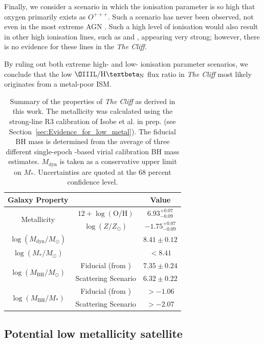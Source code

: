 \documentclass[fleqn,usenatbib]{mnras}
\newcommand{\Hbeta}{\text{H\textbeta}\xspace}
\newcommand{\HeIIL}{\permittedEL[He][ii]}
\newcommand{\CIV}{\permittedEL[C][iv]}
\newcommand{\cliff}{\textit{The Cliff}\xspace}
\begin{document}
Finally, we consider a scenario in which the ionisation parameter is so high that oxygen primarily exists as $O^{+++}$. Such a scenario has never been observed, not even in the most extreme AGN \citep{Dors2020}. 
Such a high level of ionisation would also result in other high ionisation lines, such as \CIV and \HeIIL \citep{Wang2025_HeII}, appearing very strong; however, there is no evidence for these lines in the \cliff \citep{deGraaff2025}.

By ruling out both extreme high- and low- ionisation parameter scenarios, we conclude that the low $\OIIIL/\Hbeta_\mathrm{N}$ flux ratio in \cliff most likely originates from a metal-poor ISM. 


{\renewcommand{\arraystretch}{1.4}
\begin{table}
\normalsize
\centering
 \begin{tabular}{c || c c} 
 \hline
 \hline
 Galaxy Property & & Value \\ 
 \hline
 \multirow{2}{*}{Metallicity} & $12 + \log(\mathrm{O/H})$  & $6.93^{+0.07}_{-0.09}$ \\
  & $\log(Z/Z_\odot)$ & $-1.75^{+0.07}_{-0.09}$ \\
  \hline
 $\log(M_\mathrm{dyn}/M_\odot)$ & & $8.41\pm0.12$  \\
 $\log(M_\mathrm{*}/M_\odot)$ & & $<8.41$ \\
 \hline
 \multirow{2}{*}{$\log(M_\mathrm{BH}/M_\odot)$} & Fiducial (from \Hbeta) & $7.35\pm0.24$\\
  & Scattering Scenario & $6.32\pm0.22$ \\
  \hline
 \multirow{2}{*}{$\log(M_\mathrm{BH}/M_\ast)$} & Fiducial (from \Hbeta) & $>-1.06$\\
 & Scattering Scenario & $>-2.07$\\
 \hline
 \hline
 \end{tabular}
 \caption{Summary of the properties of \cliff as derived in this work. 
 The metallicity was calculated using the strong-line R3 calibration of Isobe et al. in prep. (see Section~\ref{sec:Evidence_for_low_metal}). 
 The fiducial BH mass is determined from the average of three different single-epoch \Hbeta-based virial calibration BH mass estimates.
 $M_\mathrm{dyn}$ is taken as a conservative upper limit on $M_\ast$.
 Uncertainties are quoted at the 68 percent confidence level.}
 \label{table:galaxyproperties}
\end{table}
}

\subsection{Potential low metallicity satellite}\label{sec:satellites}
\end{document}
